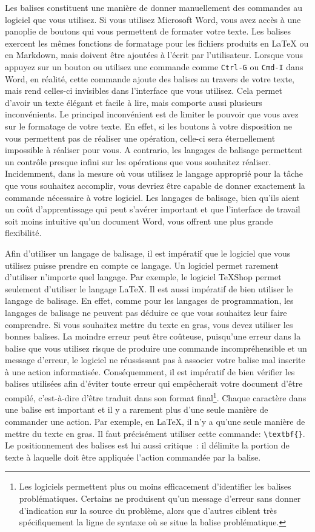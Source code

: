 \documentclass[
  letterpaper,
  DIV=11,
  numbers=noendperiod]{scrreprt}
\begin{document}
Les balises constituent une manière de donner manuellement des commandes
au logiciel que vous utilisez. Si vous utilisez Microsoft Word, vous
avez accès à une panoplie de boutons qui vous permettent de formater
votre texte. Les balises exercent les mêmes fonctions de formatage pour
les fichiers produits en LaTeX ou en Markdown, mais doivent être
ajoutées à l'écrit par l'utilisateur. Lorsque vous appuyez sur un bouton
ou utilisez une commande comme \texttt{Ctrl-G} ou \texttt{Cmd-I} dans
Word, en réalité, cette commande ajoute des balises au travers de votre
texte, mais rend celles-ci invisibles dans l'interface que vous
utilisez. Cela permet d'avoir un texte élégant et facile à lire, mais
comporte aussi plusieurs inconvénients. Le principal inconvénient est de
limiter le pouvoir que vous avez sur le formatage de votre texte. En
effet, si les boutons à votre disposition ne vous permettent pas de
réaliser une opération, celle-ci sera éternellement impossible à
réaliser pour vous. A contrario, les langages de balisage permettent un
contrôle presque infini sur les opérations que vous souhaitez réaliser.
Incidemment, dans la mesure où vous utilisez le langage approprié pour
la tâche que vous souhaitez accomplir, vous devriez être capable de
donner exactement la commande nécessaire à votre logiciel. Les langages
de balisage, bien qu'ils aient un coût d'apprentissage qui peut s'avérer
important et que l'interface de travail soit moins intuitive qu'un
document Word, vous offrent une plus grande flexibilité.

Afin d'utiliser un langage de balisage, il est impératif que le logiciel
que vous utilisez puisse prendre en compte ce langage. Un logiciel
permet rarement d'utiliser n'importe quel langage. Par exemple, le
logiciel \TeX{}Shop permet seulement d'utiliser le langage LaTeX. Il est
aussi impératif de bien utiliser le langage de balisage. En effet, comme
pour les langages de programmation, les langages de balisage ne peuvent
pas déduire ce que vous souhaitez leur faire comprendre. Si vous
souhaitez mettre du texte en gras, vous devez utiliser les bonnes
balises. La moindre erreur peut être coûteuse, puisqu'une erreur dans la
balise que vous utilisez risque de produire une commande
incompréhensible et un message d'erreur, le logiciel ne réussissant pas
à associer votre balise mal inscrite à une action informatisée.
Conséquemment, il est impératif de bien vérifier les balises utilisées
afin d'éviter toute erreur qui empêcherait votre document d'être
compilé, c'est-à-dire d'être traduit dans son format final\footnote{Les
  logiciels permettent plus ou moins efficacement d'identifier les
  balises problématiques. Certains ne produisent qu'un message d'erreur
  sans donner d'indication sur la source du problème, alors que d'autres
  ciblent très spécifiquement la ligne de syntaxe où se situe la balise
  problématique.}. Chaque caractère dans une balise est important et il
y a rarement plus d'une seule manière de commander une action. Par
exemple, en LaTeX, il n'y a qu'une seule manière de mettre du texte en
gras. Il faut précisément utiliser cette commande:
\texttt{\textbackslash{}textbf\{\}}. Le positionnement des balises est
lui aussi critique~: il délimite la portion de texte à laquelle doit
être appliquée l'action commandée par la balise.
\end{document}
